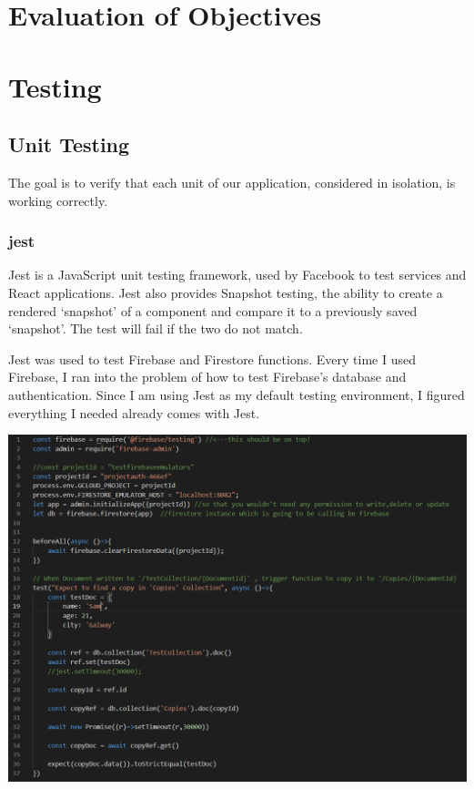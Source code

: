 \section{Evaluation of Objectives}

\section{Testing}

\subsection{Unit Testing}
The goal is to verify that each unit of our application, considered in isolation, is working correctly.

\subsubsection{jest}
Jest is a JavaScript unit testing framework, used by Facebook to test services and React applications.
Jest also provides Snapshot testing, the ability to create a rendered ‘snapshot’ of a component and compare it to a previously saved ‘snapshot’. The test will fail if the two do not match.

Jest was used to test Firebase and Firestore functions.
Every time I used Firebase, I ran into the problem of how to test Firebase's database and authentication. Since I am using Jest as my default testing environment, I figured everything I needed already comes with Jest.

\begin{center}    
      \includegraphics[scale=0.6]{img/jest.PNG}
\end{center}

